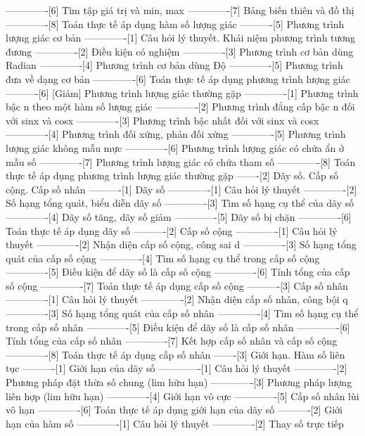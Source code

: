 -------------[6] Tìm tập giá trị và min, max
-------------[7] Bảng biến thiên và đồ thị
-------------[8] Toán thực tế áp dụng hàm số lượng giác
----------[5] Phương trình lượng giác cơ bản
-------------[1] Câu hỏi lý thuyết. Khái niệm phương trình tương đương
-------------[2] Điều kiện có nghiệm
-------------[3] Phương trình cơ bản dùng Radian
-------------[4] Phương trình cơ bản dùng Độ
-------------[5] Phương trình đưa về dạng cơ bản
-------------[6] Toán thực tế áp dụng phương trình lượng giác
----------[6] [Giảm] Phương trình lượng giác thường gặp
-------------[1] Phương trình bậc n theo một hàm số lượng giác
-------------[2] Phương trình đẳng cấp bậc n đối với sinx và cosx
-------------[3] Phương trình bậc nhất đối với sinx và cosx
-------------[4] Phương trình đối xứng, phản đối xứng
-------------[5] Phương trình lượng giác không mẫu mực
-------------[6] Phương trình lượng giác có chứa ẩn ở mẫu số
-------------[7] Phương trình lượng giác có chứa tham số
-------------[8] Toán thực tế áp dụng phương trình lượng giác thường gặp
-------[2] Dãy số. Cấp số cộng. Cấp số nhân
----------[1] Dãy số
-------------[1] Câu hỏi lý thuyết
-------------[2] Số hạng tổng quát, biểu diễn dãy số
-------------[3] Tìm số hạng cụ thể của dãy số
-------------[4] Dãy số tăng, dãy số giảm
-------------[5] Dãy số bị chặn
-------------[6] Toán thực tế áp dụng dãy số
----------[2] Cấp số cộng
-------------[1] Câu hỏi lý thuyết
-------------[2] Nhận diện cấp số cộng, công sai d
-------------[3] Số hạng tổng quát của cấp số cộng
-------------[4] Tìm số hạng cụ thể trong cấp số cộng
-------------[5] Điều kiện để dãy số là cấp số cộng
-------------[6] Tính tổng của cấp số cộng
-------------[7] Toán thực tế áp dụng cấp số cộng
----------[3] Cấp số nhân
-------------[1] Câu hỏi lý thuyết
-------------[2] Nhận diện cấp số nhân, công bội q
-------------[3] Số hạng tổng quát của cấp số nhân
-------------[4] Tìm số hạng cụ thể trong cấp số nhân
-------------[5] Điều kiện để dãy số là cấp số nhân
-------------[6] Tính tổng của cấp số nhân
-------------[7] Kết hợp cấp số nhân và cấp số cộng
-------------[8] Toán thực tế áp dụng cấp số nhân
-------[3] Giới hạn. Hàm số liên tục
----------[1] Giới hạn của dãy số
-------------[1] Câu hỏi lý thuyết
-------------[2] Phương pháp đặt thừa số chung (lim hữu hạn)
-------------[3] Phương pháp lượng liên hợp (lim hữu hạn)
-------------[4] Giới hạn vô cực
-------------[5] Cấp số nhân lùi vô hạn
-------------[6] Toán thực tế áp dụng giới hạn của dãy số
----------[2] Giới hạn của hàm số
-------------[1] Câu hỏi lý thuyết
-------------[2] Thay số trực tiếp
